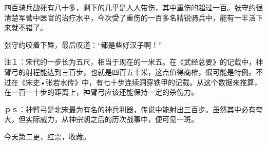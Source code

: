 四百骑兵战死有八十多，剩下的几乎是人人带伤，其中重伤的超过一百。张守约很清楚军营中医官的治疗水平，今次受了重伤的一百多名精锐骑兵中，能有一半活下来就不错了。

张守约咬着下唇，最后叹道：“都是些好汉子啊！”

注１：宋代的一步长为五尺，相当于现在的一米五。在《武经总要》的记载中，神臂弓的射程能达到三百步，也就是四百五十米，这点值得商榷，很可能是特例。不过在《宋史•张若水传》中，有七十步连续洞穿铁甲的记载。从这个数据来推算，在一百一十步的距离上，神臂弓应该还能保持一定的杀伤力。

ｐｓ：神臂弓是北宋最为有名的神兵利器，传说中能射出三百步。虽然其中必有夸大，但实际威力，从神宗朝之后的历次战事中，便可见一斑。

今天第二更，红票，收藏。

